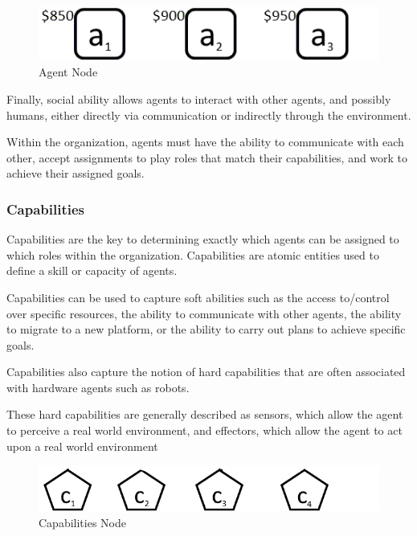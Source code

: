 \hspace{1cm}
\begin{figure}[th]
	\centering
		\includegraphics[scale=0.5]{chapiter1/img/agents}
	\caption{\label{fig:Agent Node}Agent Node }
\end{figure}
\hspace{1cm}



Finally, social ability allows agents to interact with
other agents, and possibly humans, either directly via communication or indirectly through the
environment.

Within the organization, agents must have the ability to communicate with each other, accept
assignments to play roles that match their capabilities, and work to achieve their assigned goals. \cite{omacs2}


\subsubsection{ Capabilities } 

Capabilities are the key to determining exactly which agents can be assigned to which roles
within the organization. Capabilities are atomic entities used to define a skill or capacity of
agents. \cite{omacs2}

Capabilities can be used to capture soft abilities such as the access to/control over specific
resources, the ability to communicate with other agents, the ability to migrate to a new platform,
or the ability to carry out plans to achieve specific goals. 

Capabilities also capture the notion of hard capabilities that are often associated 
with hardware agents such as robots. 

These hard capabilities are generally described as sensors, which allow the agent to perceive a real world
environment, and effectors, which allow the agent to act upon a real world environment  \cite{omacs2}

\hspace{1cm}
\begin{figure}[th]
	\centering
		\includegraphics[scale=0.5]{chapiter1/img/capabilities}
	\caption{\label{fig:Cap Node}Capabilities Node }
\end{figure}
\hspace{0.5cm}


